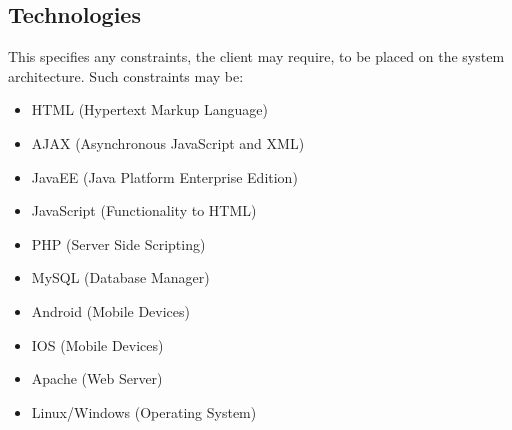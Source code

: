 \documentclass[a4paper]{article}
\begin{document}
	\subsection{Technologies}
	This specifies any constraints, the client may require, to be placed on the system architecture. Such constraints may be:
	\begin{itemize}
		\item HTML (Hypertext Markup Language)
		\item AJAX (Asynchronous JavaScript and XML)
		\item JavaEE (Java Platform Enterprise Edition)
		\item JavaScript (Functionality to HTML)
		\item PHP (Server Side Scripting)
		\item MySQL (Database Manager)
		\item Android (Mobile Devices)
		\item IOS (Mobile Devices)
		\item Apache (Web Server)
		\item Linux/Windows (Operating System)
		\\
		\\
	\end{itemize}
	\pagebreak
\end{document}
